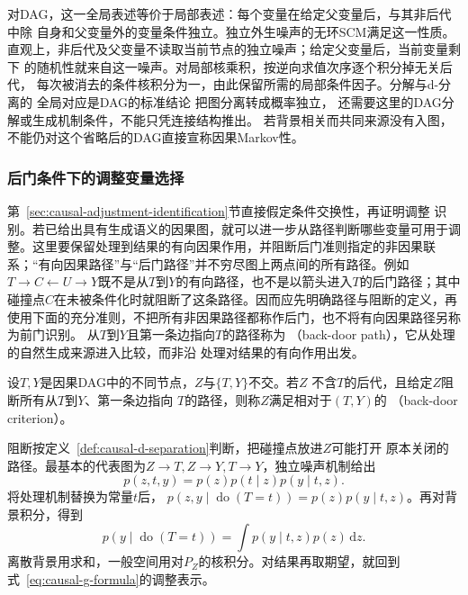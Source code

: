 对DAG，这一全局表述等价于局部表述：每个变量在给定父变量后，与其非后代中除
自身和父变量外的变量条件独立。独立外生噪声的无环SCM满足这一性质。
直观上，非后代及父变量不读取当前节点的独立噪声；给定父变量后，当前变量剩下
的随机性就来自这一噪声。对局部核乘积，按逆向求值次序逐个积分掉无关后代，
每次被消去的条件核积分为一，由此保留所需的局部条件因子。分解与d-分离的
全局对应是DAG的标准结论
把图分离转成概率独立，
还需要这里的DAG分解或生成机制条件，不能只凭连接结构推出。
若背景相关而共同来源没有入图，不能仍对这个省略后的DAG直接宣称因果Markov性。

\subsubsection{后门条件下的调整变量选择}
\label{sec:causal-backdoor-selection}

第~\ref{sec:causal-adjustment-identification}节直接假定条件交换性，再证明调整
识别。若已给出具有生成语义的因果图，就可以进一步从路径判断哪些变量可用于调整。这里要保留处理到结果的有向因果作用，并阻断后门准则指定的非因果联系；“有向因果路径”与“后门路径”并不穷尽图上两点间的所有路径。例如\(T\to C\leftarrow U\to Y\)既不是从\(T\)到\(Y\)的有向路径，也不是以箭头进入\(T\)的后门路径；其中碰撞点\(C\)在未被条件化时就阻断了这条路径。因而应先明确路径与阻断的定义，再使用下面的充分准则，不把所有非因果路径都称作后门，也不将有向因果路径另称为前门识别。
从\(T\)到\(Y\)且第一条边指向\(T\)的路径称为
（back-door path），它从处理的自然生成来源进入比较，而非沿
处理对结果的有向作用出发。

\begin{definition}
  \label{def:causal-backdoor-criterion}
  设\(T,Y\)是因果DAG中的不同节点，\(Z\)与\(\{T,Y\}\)不交。若\(Z\)
  不含\(T\)的后代，且给定\(Z\)阻断所有从\(T\)到\(Y\)、第一条边指向
  \(T\)的路径，则称\(Z\)满足相对于\((T,Y)\)的
  （back-door criterion）。
\end{definition}

阻断按定义~\ref{def:causal-d-separation}判断，把碰撞点放进\(Z\)可能打开
原本关闭的路径。最基本的代表图为\(Z\to T,Z\to Y,T\to Y\)，独立噪声机制给出
\[
  p(z,t,y)=p(z)p(t\mid z)p(y\mid t,z).
\]
将处理机制替换为常量\(t\)后，
\(p(z,y\mid\operatorname{do}(T=t))=p(z)p(y\mid t,z)\)。再对背景积分，得到
\begin{equation}
  p(y\mid\operatorname{do}(T=t))
  =
  \int p(y\mid t,z)p(z)\,\mathrm dz.
  \label{eq:causal-backdoor-adjustment}
\end{equation}
离散背景用求和，一般空间用对\(P_Z\)的核积分。对结果再取期望，就回到
式~\eqref{eq:causal-g-formula}的调整表示。

